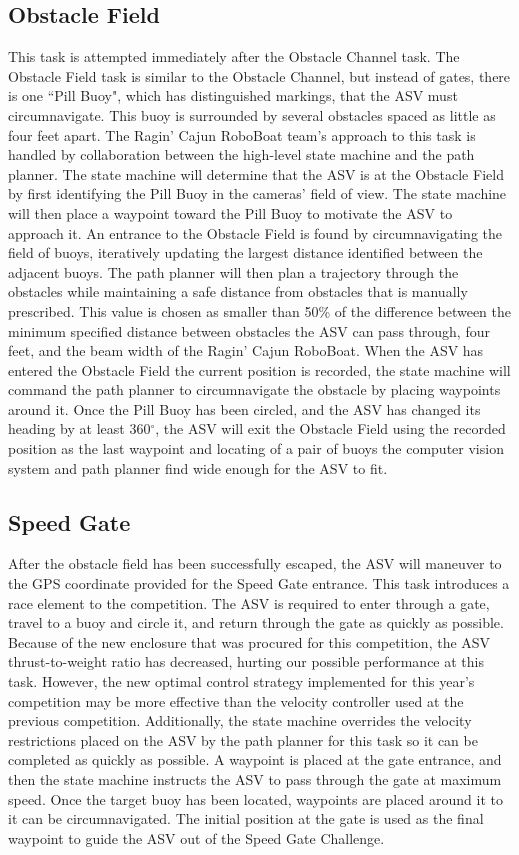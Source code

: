 \documentclass[letterpaper, 10 pt, conference]{ieeeconf}
\begin{document}
\subsection{Obstacle Field}
\label{ObstacleField}
This task is attempted immediately after the Obstacle Channel task. The Obstacle Field task is similar to the Obstacle Channel, but instead of gates, there is one ``Pill Buoy", which has distinguished markings, that the ASV must circumnavigate. This buoy is surrounded by several obstacles spaced as little as four feet apart. The Ragin' Cajun RoboBoat team's approach to this task is handled by collaboration between the high-level state machine and the path planner. The state machine will determine that the ASV is at the Obstacle Field by first identifying the Pill Buoy in the cameras' field of view. The state machine will then place a waypoint toward the Pill Buoy to motivate the ASV to approach it. An entrance to the Obstacle Field is found by circumnavigating the field of buoys, iteratively updating the largest distance identified between the adjacent buoys. The path planner will then plan a trajectory through the obstacles while maintaining a safe distance from obstacles that is manually prescribed. This value is chosen as smaller than 50\% of the difference between the minimum specified distance between obstacles the ASV can pass through, four feet, and the beam width of the Ragin' Cajun RoboBoat. When the ASV has entered the Obstacle Field the current position is recorded, the state machine will command the path planner to circumnavigate the obstacle by placing waypoints around it. Once the Pill Buoy has been circled, and the ASV has changed its heading by at least 360$^\circ$, the ASV will exit the Obstacle Field using the recorded position as the last waypoint  and locating of a pair of buoys the computer vision system and path planner find wide enough for the ASV to fit.

\subsection{Speed Gate}
\label{SpeedGate}
After the obstacle field has been successfully escaped, the ASV will maneuver to the GPS coordinate provided for the Speed Gate entrance. This task introduces a race element to the competition. The ASV is required to enter through a gate, travel to a buoy and circle it, and return through the gate as quickly as possible. Because of the new enclosure that was procured for this competition, the ASV thrust-to-weight ratio has decreased, hurting our possible performance at this task. However, the new optimal control strategy implemented for this year's competition may be more effective than the velocity controller used at the previous competition. Additionally, the state machine overrides the velocity restrictions placed on the ASV by the path planner for this task so it can be completed as quickly as possible. A waypoint is placed at the gate entrance, and then the state machine instructs the ASV to pass through the gate at maximum speed. Once the target buoy has been located, waypoints are placed around it to it can be circumnavigated. The initial position at the gate is used as the final waypoint to guide the ASV out of the Speed Gate Challenge.
\end{document}

